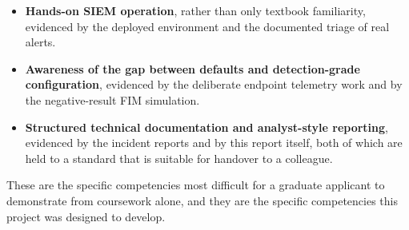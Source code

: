 \begin{itemize}[leftmargin=*]
    \item \textbf{Hands-on SIEM operation}, rather than only textbook
          familiarity, evidenced by the deployed environment and the
          documented triage of real alerts.
    \item \textbf{Awareness of the gap between defaults and
          detection-grade configuration}, evidenced by the deliberate
          endpoint telemetry work and by the negative-result FIM
          simulation.
    \item \textbf{Structured technical documentation and analyst-style
          reporting}, evidenced by the incident reports and by this
          report itself, both of which are held to a standard that is
          suitable for handover to a colleague.
\end{itemize}

These are the specific competencies most difficult for a graduate applicant
to demonstrate from coursework alone, and they are the specific
competencies this project was designed to develop.
